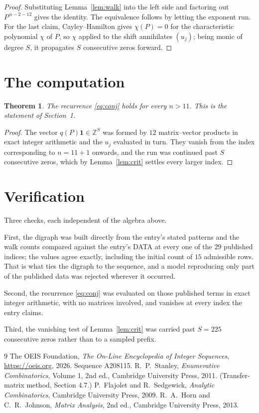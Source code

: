 \documentclass[11pt,a4paper]{article}
\theoremstyle{plain}
\newtheorem{theorem}{Theorem}
\theoremstyle{definition}
\begin{document}
\begin{proof}
Substituting Lemma~\ref{lem:walk} into the left side and factoring out
$P^{\,n-2-12}$ gives the identity. The equivalence follows by letting the exponent
run. For the last claim, Cayley--Hamilton gives $\chi(P)=0$ for the characteristic
polynomial $\chi$ of $P$, so $\chi$ applied to the shift annihilates $(u_j)$; being monic of
degree $S$, it propagates $S$ consecutive zeros forward.
\end{proof}

\section{The computation}

\begin{theorem}
The recurrence \eqref{eq:conj} holds for every $n>11$. This is the statement of
Section~1.
\end{theorem}

\begin{proof}
The vector $q(P)\mathbf{1}\in\mathbb{Z}^{S}$ was formed by $12$ matrix--vector
products in exact integer arithmetic and the $u_j$ evaluated in turn. They vanish from the
index corresponding to $n=11+1$ onwards, and the run was continued past $S$ consecutive
zeros, which by Lemma~\ref{lem:crit} settles every larger index.
\end{proof}

\section{Verification}

Three checks, each independent of the algebra above.

First, the digraph was built directly from the entry's stated patterns and the walk counts
compared against the entry's DATA at every one of the $29$ published indices; the
values agree exactly, including the initial count of $15$ admissible rows. That is
what ties the digraph to the sequence, and a model reproducing only part of the published
data was rejected wherever it occurred.

Second, the recurrence \eqref{eq:conj} was evaluated on those published terms in exact
integer arithmetic, with no matrices involved, and vanishes at every index the entry claims.

Third, the vanishing test of Lemma~\ref{lem:crit} was carried past $S=225$ consecutive
zeros rather than to a sampled prefix.

\begin{thebibliography}{9}
 The OEIS Foundation, \emph{The On-Line Encyclopedia of Integer
Sequences}, \url{https://oeis.org}, 2026. Sequence A208115.
 R.~P.~Stanley, \emph{Enumerative Combinatorics}, Volume 1, 2nd ed.,
Cambridge University Press, 2011. (Transfer-matrix method, Section 4.7.)
 P.~Flajolet and R.~Sedgewick, \emph{Analytic Combinatorics}, Cambridge
University Press, 2009.
 R.~A.~Horn and C.~R.~Johnson, \emph{Matrix Analysis}, 2nd ed., Cambridge
University Press, 2013.
\end{thebibliography}
\end{document}
